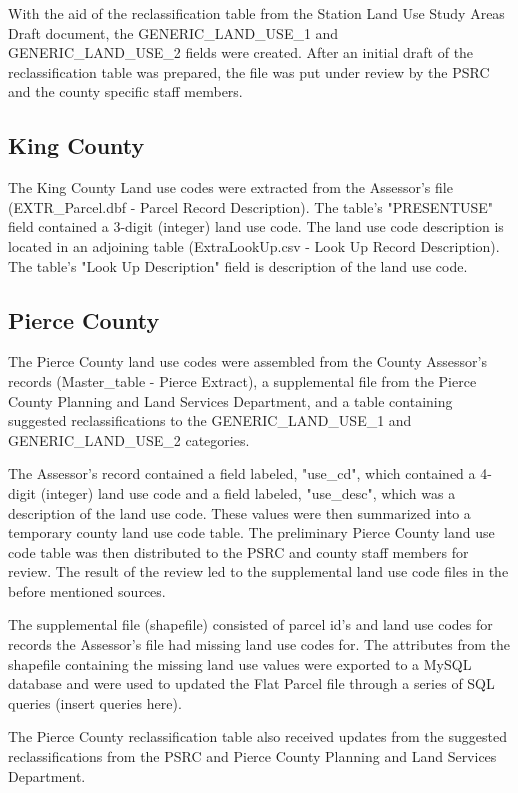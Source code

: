 With the aid of the reclassification table from the Station Land
Use Study Areas Draft document, the GENERIC_LAND_USE_1 and
GENERIC_LAND_USE_2 fields were created. After an initial draft of
the reclassification table was prepared, the file was put under
review by the PSRC and the county specific staff members.

\subsection{King County}

The King County Land use codes were extracted from the Assessor's
file (EXTR_Parcel.dbf - Parcel Record Description). The table's
"PRESENTUSE" field contained a 3-digit (integer) land use code.
The land use code description is located in an adjoining table
(ExtraLookUp.csv - Look Up Record Description). The table's "Look
Up Description" field is description of the land use code.

\subsection{Pierce County}

The Pierce County land use codes were assembled from the County
Assessor's records (Master_table - Pierce Extract), a supplemental
file from the Pierce County Planning and Land Services Department,
and a table containing suggested reclassifications to the
GENERIC_LAND_USE_1 and GENERIC_LAND_USE_2 categories.

The Assessor's record contained a field labeled, "use_cd", which
contained a 4-digit (integer) land use code and a field labeled,
"use_desc", which was a description of the land use code. These
values were then summarized into a temporary county land use code
table. The preliminary Pierce County land use code table was then
distributed to the PSRC and county staff members for review. The
result of the review led to the supplemental land use code files
in the before mentioned sources.

The supplemental file (shapefile) consisted of parcel id's and
land use codes for records the Assessor's file had missing land
use codes for. The attributes from the shapefile containing the
missing land use values were exported to a MySQL database and were
used to updated the Flat Parcel file through a series of SQL
queries (insert queries here).

The Pierce County reclassification table also received updates
from the suggested reclassifications from the PSRC and Pierce
County Planning and Land Services Department.

